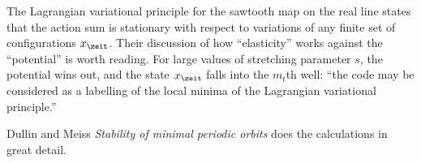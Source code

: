 \begin{description}
{The Lagrangian variational principle for the sawtooth map on the real
line states that the action sum
is stationary with respect to variations of any finite set of
configurations $\ssp_{\zeit}$. Their discussion of how ``elasticity''
works against the ``potential'' is worth reading. For large values of
stretching parameter $s$, the potential wins out, and the state
$\ssp_{\zeit}$ falls into the $m_t$th well:
``the code may be considered as a labelling of the local minima of the
Lagrangian variational principle.''

Dullin and Meiss {\em Stability of minimal periodic orbits}
does the calculations in great detail.
    }








\end{description}
